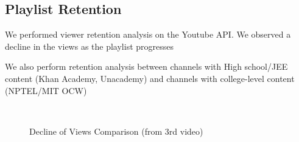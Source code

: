 \documentclass{article}
\begin{document}
\newpage
\subsection{Playlist Retention}
We performed viewer retention analysis on the Youtube API. We observed a decline in the views as the playlist progresses

We also perform retention analysis between channels with High school/JEE content (Khan Academy, Unacademy) and channels with college-level content (NPTEL/MIT OCW)

\begin{figure}[!htpb]
    \centering
    \hspace*{-2.5em} \hspace*{-4em}
    \qquad
    \\
    \label{fig:example}%
    \caption{Decline of Views Comparison (from 3rd video)}
\end{figure}
\FloatBarrier
\end{document}
